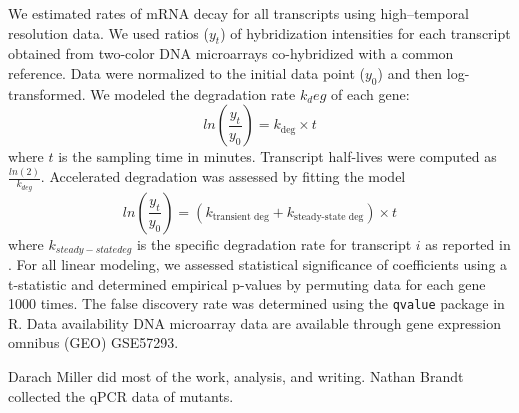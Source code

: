 We estimated rates of
mRNA decay for all transcripts using high–temporal resolution data. We
used ratios ($y_t$) of hybridization intensities for each transcript
obtained from two-color DNA microarrays co-hybridized with a common
reference. Data were normalized to the initial data point ($y_0$) and
then log-transformed. We modeled the degradation rate $k_deg$ of each
gene:
$$ ln\left(\frac{y_t}{y_0}\right)=k_{\text{deg}}\times t$$
where $t$ is the sampling time in minutes. Transcript
half-lives were computed as $\frac{ln(2)}{k_{deg}}$. 
Accelerated degradation was
assessed by fitting the model 
$$ ln\left(\frac{y_t}{y_0}\right)=(k_{\text{transient
deg}}+k_{\text{steady-state deg}})\times t$$
where $k_{steady-state deg}$ 
is the specific degradation rate for transcript $i$ as reported in 
\cite{neymotin2014determination}.
For all linear modeling, we assessed statistical
significance of coefficients using a t-statistic and determined
empirical p-values by permuting data for each gene 1000 times. The
false discovery rate was determined using the \texttt{qvalue} package in R.
Data availability DNA microarray data are available through gene
expression omnibus (GEO) GSE57293.

Darach Miller did most of the work, analysis, and writing.
Nathan Brandt collected the qPCR data of mutants.
